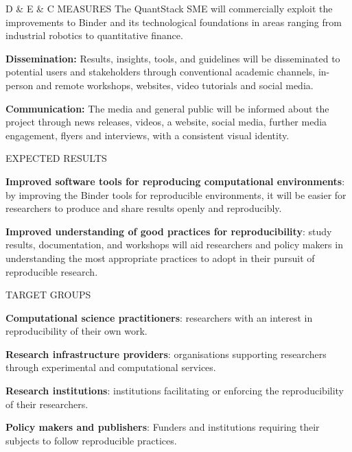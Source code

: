 \begin{multicols}{2}
\begin{summarybox}{D \& E \& C MEASURES}
The QuantStack SME will commercially exploit the improvements to Binder and its technological foundations in areas ranging from
industrial robotics to quantitative finance.

\textbf{Dissemination:} Results, insights, tools, and guidelines will
  be disseminated to potential users and stakeholders through conventional
  academic channels, in-person and remote workshops, websites, video tutorials
  and social media.

\textbf{Communication:} The media and general public will be informed
  about the project through news releases, videos, a website, social media,
  further media engagement, flyers and interviews, with a consistent visual
  identity.
\end{summarybox}

\begin{summarybox}{EXPECTED RESULTS}

\textbf{Improved software tools for reproducing computational environments}:
by improving the Binder tools for reproducible environments,
it will be easier for researchers to produce and share results openly and reproducibly.

\textbf{Improved understanding of good practices for reproducibility}: study results, documentation, and workshops will aid researchers and policy makers in understanding the most appropriate practices to adopt in their pursuit of reproducible research.

\end{summarybox}

\begin{summarybox}{TARGET GROUPS}

\textbf{Computational science practitioners}: researchers with an interest in reproducibility of their own work.

\textbf{Research infrastructure providers}: organisations supporting researchers
through experimental and computational services.

\textbf{Research institutions}: institutions facilitating or enforcing the reproducibility of their researchers.

\textbf{Policy makers and publishers}: Funders and institutions requiring their subjects to follow reproducible practices.
\end{summarybox}


\end{multicols}
